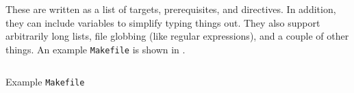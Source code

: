 These are written as a list of targets, prerequisites, and directives.
In addition, they can include variables to simplify typing things out.
They also support arbitrarily long lists, file globbing (like regular expressions), and a couple of other things.
An example \texttt{Makefile} is shown in .

\begin{listing}[h!tbp]
\inputminted[frame=lines,linenos]{makefile}{./C_Primer-Sections/Compilation/Code/Example_Makefile}
\caption{Example \texttt{Makefile}}
\label{lst:Example_Makefile}
\end{listing}


